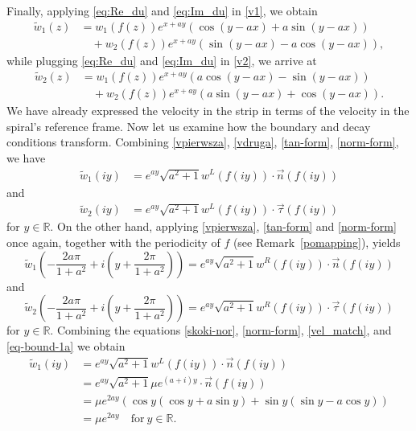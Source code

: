 \documentclass[11pt, letterpaper, reqno]{amsart}
\numberwithin{equation}{section}
\theoremstyle{definition}
\theoremstyle{plain}
\numberwithin{equation}{section}
\def\R{\mathbb{R}}
\begin{document}
Finally, applying \eqref{eq:Re_du} and \eqref{eq:Im_du} in \eqref{v1}, we obtain
\begin{equation}\label{vpierwsza}
\begin{aligned} 
\tilde{w}_1(z)&= w_1(f(z))e^{x+ay}(\cos(y - ax) +a \sin(y - ax))\\
& \quad + w_2(f(z))e^{x+ay} (\sin(y - ax) - a \cos(y - ax)),
\end{aligned}
\end{equation}
while plugging \eqref{eq:Re_du} and \eqref{eq:Im_du} in \eqref{v2}, we arrive at
\begin{equation}\label{vdruga}
\begin{aligned}
\tilde{w}_2(z) &= w_1(f(z))e^{x+ay}\left(a\cos(y-ax)-\sin(y-ax)\right) \\
&\quad +w_2(f(z))e^{x+ay}\left(a\sin(y-ax)+\cos(y-ax)\right).
\end{aligned}
\end{equation}
We have already expressed the velocity in the strip in terms of the velocity in the spiral’s reference frame. Now let us examine how the boundary and decay conditions transform. Combining \eqref{vpierwsza}, \eqref{vdruga}, \eqref{tan-form}, \eqref{norm-form}, we have
\begin{align}\label{eq-bound-1a}
\tilde{w}_{1}(i y) & = e^{ay} \sqrt{a^2+1}  w^{L}(f(iy)) \cdot \vec{n}(f(iy))
\end{align}
and
\begin{align}\label{eq-bound-1b}
\tilde{w}_{2}(i y) & = e^{ay} \sqrt{a^2+1}  w^{L}(f(iy)) \cdot \vec{\tau}(f(iy))
\end{align}
for $y\in\R$. On the other hand, applying \eqref{vpierwsza}, \eqref{tan-form} and \eqref{norm-form} once again, together with the periodicity of $f$ (see Remark \ref{pomapping}), yields
\begin{equation}\label{eq-bound-2a}
\tilde{w}_{1}\left(-\frac{2a\pi}{1+a^2} + i\left(y + \frac{2\pi}{1+a^2}\right)\right) = e^{ay} \sqrt{a^2+1}  w^{R}(f(iy)) \cdot \vec{n}(f(iy))
\end{equation}
and
\begin{equation}\label{eq-bound-2b}
\tilde{w}_{2}\left(-\frac{2a\pi}{1+a^2} + i\left(y + \frac{2\pi}{1+a^2}\right)\right) = e^{ay} \sqrt{a^2+1}  w^{R}(f(iy)) \cdot \vec{\tau}(f(iy))
\end{equation}
for $y\in\R$.
Combining the equations \eqref{skoki-nor}, \eqref{norm-form}, \eqref{vel_match}, and \eqref{eq-bound-1a} we obtain
\begin{equation}
\begin{aligned}\label{eq-36aa}
\tilde{w}_{1}(i y) & = e^{ay} \sqrt{a^2+1}  w^{L}(f(iy)) \cdot \vec{n}(f(iy)) \\
&= e^{ay} \sqrt{a^2+1} \mu e^{(a+i)y} \cdot \vec{n}(f(iy)) \\
&= \mu e^{2ay} (\cos y(\cos y + a\sin y) + \sin y(\sin y - a\cos y)) \\
&= \mu e^{2ay} \quad \text{for} \  y\in\R.
\end{aligned}
\end{equation}
\end{document}
